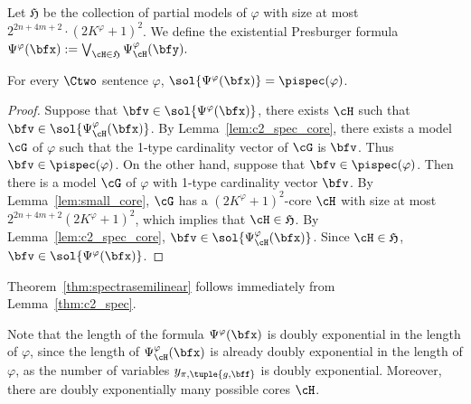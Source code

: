 Let $\mathfrak{H}$ be the collection of partial models of $\varphi$ with size at most $2^{2n+4m+2} \cdot (2K^\varphi+1)^2$.
We define the existential Presburger formula 
$\Psi^\varphi(\bfx)
 := 
\bigvee_{\cH \in \mathfrak{H}}
\Psi^\varphi_{\cH}(\bfy).$

\begin{lemma}\label{thm:c2_spec}
    For every $\Ctwo$ sentence $\varphi$,
    $\sol{\Psi^\varphi(\bfx)} = \pispec(\varphi)$.
\end{lemma}

\begin{proof}
    Suppose that $\bfv \in \sol{\Psi^\varphi(\bfx)}$,
    there exists $\cH$ such that $\bfv \in \sol{\Psi^\varphi_\cH(\bfx)}$.
    By Lemma~\ref{lem:c2_spec_core},
    there exists a model $\cG$ of $\varphi$ such that the 1-type cardinality vector of $\cG$ is $\bfv$.
    Thus $\bfv \in \pispec(\varphi)$.
    On the other hand, suppose that $\bfv \in \pispec(\varphi)$.
    Then there is a model $\cG$ of $\varphi$ with 1-type cardinality vector  $\bfv$.
    By Lemma~\ref{lem:small_core}, $\cG$ has a $(2K^\varphi+1)^2$-core $\cH$ with size at most $2^{2n+4m+2}(2K^\varphi+1)^2$,
    which implies that $\cH \in \mathfrak{H}$.
    By Lemma~\ref{lem:c2_spec_core},
    $\bfv \in \sol{\Psi^\varphi_\cH(\bfx)}$.
    Since $\cH \in \mathfrak{H}$,
    $\bfv \in \sol{\Psi^\varphi(\bfx)}$.
\end{proof}

Theorem~\ref{thm:spectrasemilinear} follows immediately from Lemma~\ref{thm:c2_spec}.

Note that the length of the formula $\Psi^\varphi(\bfx)$ is doubly exponential in the length of $\varphi$,
since the length of $\Psi^\varphi_\cH(\bfx)$ is already doubly exponential in the length of $\varphi$, 
as the number of variables $y_{\pi, \tuple{g, \bff}}$ is doubly exponential.
Moreover, there are doubly exponentially many possible cores $\cH$.

